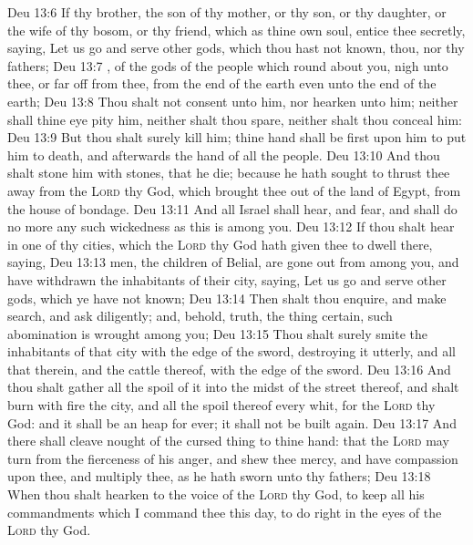 \vs Deu 13:6 If thy brother, the son of thy mother, or thy son, or thy daughter, or the wife of thy bosom, or thy friend, which  as thine own soul, entice thee secretly, saying, Let us go and serve other gods, which thou hast not known, thou, nor thy fathers;
\vs Deu 13:7 , of the gods of the people which  round about you, nigh unto thee, or far off from thee, from the  end of the earth even unto the  end of the earth;
\vs Deu 13:8 Thou shalt not consent unto him, nor hearken unto him; neither shall thine eye pity him, neither shalt thou spare, neither shalt thou conceal him:
\vs Deu 13:9 But thou shalt surely kill him; thine hand shall be first upon him to put him to death, and afterwards the hand of all the people.
\vs Deu 13:10 And thou shalt stone him with stones, that he die; because he hath sought to thrust thee away from the \textsc{Lord} thy God, which brought thee out of the land of Egypt, from the house of bondage.
\vs Deu 13:11 And all Israel shall hear, and fear, and shall do no more any such wickedness as this is among you.
\vs Deu 13:12 If thou shalt hear  in one of thy cities, which the \textsc{Lord} thy God hath given thee to dwell there, saying,
\vs Deu 13:13  men, the children of Belial, are gone out from among you, and have withdrawn the inhabitants of their city, saying, Let us go and serve other gods, which ye have not known;
\vs Deu 13:14 Then shalt thou enquire, and make search, and ask diligently; and, behold,  truth,  the thing certain,  such abomination is wrought among you;
\vs Deu 13:15 Thou shalt surely smite the inhabitants of that city with the edge of the sword, destroying it utterly, and all that  therein, and the cattle thereof, with the edge of the sword.
\vs Deu 13:16 And thou shalt gather all the spoil of it into the midst of the street thereof, and shalt burn with fire the city, and all the spoil thereof every whit, for the \textsc{Lord} thy God: and it shall be an heap for ever; it shall not be built again.
\vs Deu 13:17 And there shall cleave nought of the cursed thing to thine hand: that the \textsc{Lord} may turn from the fierceness of his anger, and shew thee mercy, and have compassion upon thee, and multiply thee, as he hath sworn unto thy fathers;
\vs Deu 13:18 When thou shalt hearken to the voice of the \textsc{Lord} thy God, to keep all his commandments which I command thee this day, to do  right in the eyes of the \textsc{Lord} thy God.
